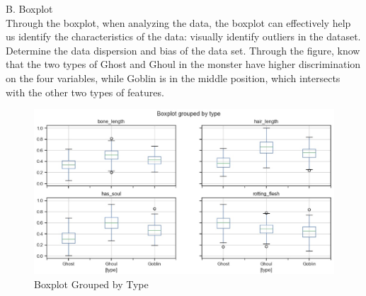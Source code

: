 \hspace*{0.4cm}B. Boxplot\\
\hspace*{0.4cm}Through the boxplot, when analyzing the data, the boxplot can effectively help us identify the characteristics of the data: visually identify outliers in the dataset. Determine the data dispersion and bias of the data set. Through the figure, know that the two types of Ghost and Ghoul in the monster have higher discrimination on the four variables, while Goblin is in the middle position, which intersects with the other two types of features.\\
\begin{figure}[h]\centering
	\includegraphics[scale=0.3]{4.eps}
	\caption{Boxplot Grouped by Type}
\end{figure}


